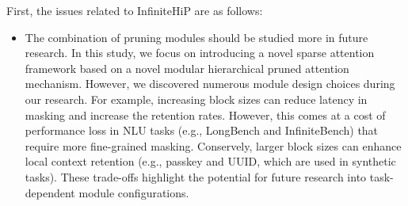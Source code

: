 First, the issues related to InfiniteHiP are as follows:
\begin{itemize}
\item The combination of pruning modules should be studied more in future research. In this study, we focus on introducing a novel sparse attention framework based on a novel modular hierarchical pruned attention mechanism. However, we discovered numerous module design choices during our research. For example, increasing block sizes can reduce latency in masking and increase the retention rates. However, this comes at a cost of performance loss in NLU tasks (e.g., LongBench and InfiniteBench) that require more fine-grained masking. Conservely, larger block sizes can enhance local context retention (e.g., passkey and UUID, which are used in synthetic tasks). These trade-offs highlight the potential for future research into task-dependent module configurations.
\end{itemize}

